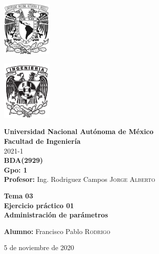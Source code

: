 \documentclass{article}
\newcommand{\materia}{BDA}
\newcommand{\clave}{2929}
\newcommand{\profesor}{Ing. Rodriguez Campos \textsc{Jorge Alberto}}
\newcommand{\semestre}{2021-1}
\newcommand{\alumno}{Francisco Pablo \textsc{Rodrigo}}
\newcommand{\actividad}{Tema 03 \\ Ejercicio práctico 01}
\newcommand{\titulo}{Administración de parámetros}
\newcommand{\fechaEntrega}{5 de noviembre de 2020}
\begin{document}
\thispagestyle{empty}
\begin{minipage}[t][5cm][t]{0.2\linewidth}
    \includegraphics[width=2.5cm]{unam.jpg}
    \vspace{10cm}

    \includegraphics[width=2.5cm]{fiblack}
\end{minipage}
\begin{minipage}[t]{0.7\linewidth}
    \vspace{-2.5cm}
    \LARGE{\textbf{Universidad Nacional Autónoma de México}}\\
    \Large{\textbf{Facultad de Ingeniería}} \\

    \large{\semestre}\\[2cm]

    \large{\textbf{\materia (\clave)}}\\
    \large{\textbf{Gpo: 1}}\\[5mm]
    \large{\textbf{Profesor:} \profesor}\\ [1.5cm]
    \begin{center}
        \LARGE{\textbf{\actividad}}\\
        \LARGE{\textbf{\titulo}}\\
    \end{center}

    \vspace{3.3cm}

    \large{\textbf{Alumno:} \alumno} \\[1.5cm]

    \begin{flushright}
        \fechaEntrega%
    \end{flushright}
\end{minipage}

\newpage
\end{document}
